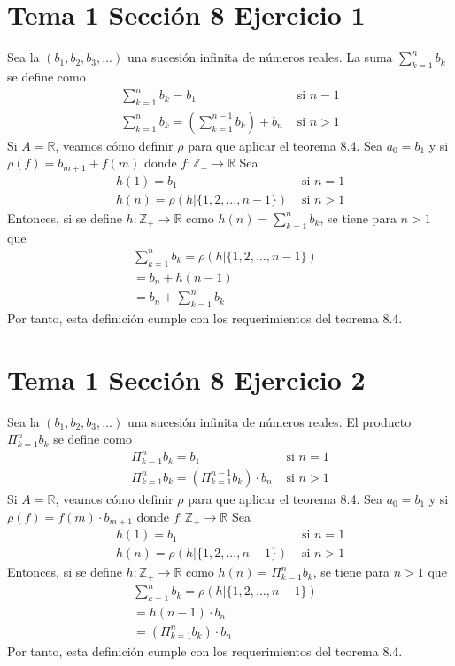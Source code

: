 \documentclass{article}
\begin{document}
\section{Tema 1 Sección 8 Ejercicio 1}
Sea la $(b_1,b_2,b_3,...)$ una sucesión infinita de números reales. La suma $\sum^n_{k=1}b_k$ se define como
\begin{eqnarray}
\sum^n_{k=1}b_k=b_1 & \text{ si }n=1 \nonumber\\
\sum^n_{k=1}b_k= (\sum^{n-1}_{k=1}b_k)+ b_n & \text{ si }n>1 \nonumber
\end{eqnarray}
Si $A=\mathbb{R}$, veamos cómo definir $\rho$ para que aplicar el teorema 8.4. Sea $a_0=b_1$ y si $\rho(f)=b_{m+1} +f(m)$ donde $f:\mathbb{Z}_{+} \rightarrow \mathbb{R}$ Sea 
\begin{eqnarray}
h(1)=b_1 & \text{ si }n=1 \nonumber\\
h(n)=\rho(h|\{1,2,...,n-1\}) & \text{ si }n>1 \nonumber
\end{eqnarray}
Entonces, si se define  $h:\mathbb{Z}_{+} \rightarrow \mathbb{R}$ como $h(n)=\sum^n_{k=1}b_k$, se tiene para $n>1$ que 
\begin{eqnarray}
\sum^n_{k=1}b_k=\rho(h|\{1,2,...,n-1\}) & \nonumber\\
=b_n+h(n-1) & \nonumber\\
=b_n+\sum^n_{k=1}b_k & \nonumber
\end{eqnarray}
Por tanto, esta definición cumple con los requerimientos del teorema 8.4.
\section{Tema 1 Sección 8 Ejercicio 2}
Sea la $(b_1,b_2,b_3,...)$ una sucesión infinita de números reales. El producto $\Pi^n_{k=1}b_k$ se define como
\begin{eqnarray}
\Pi^n_{k=1}b_k=b_1 & \text{ si }n=1 \nonumber\\
\Pi^n_{k=1}b_k= (\Pi^{n-1}_{k=1}b_k)\cdot b_n & \text{ si }n>1 \nonumber
\end{eqnarray}
Si $A=\mathbb{R}$, veamos cómo definir $\rho$ para que aplicar el teorema 8.4. Sea $a_0=b_1$ y si $\rho(f)=f(m)\cdot b_{m+1}$ donde $f:\mathbb{Z}_{+} \rightarrow \mathbb{R}$ Sea 
\begin{eqnarray}
h(1)=b_1 & \text{ si }n=1 \nonumber\\
h(n)=\rho(h|\{1,2,...,n-1\}) & \text{ si }n>1 \nonumber
\end{eqnarray}
Entonces, si se define  $h:\mathbb{Z}_{+} \rightarrow \mathbb{R}$ como $h(n)=\Pi^n_{k=1}b_k$, se tiene para $n>1$ que 
\begin{eqnarray}
\sum^n_{k=1}b_k=\rho(h|\{1,2,...,n-1\}) & \nonumber\\
=h(n-1)\cdot b_n & \nonumber\\
=(\Pi^n_{k=1}b_k)\cdot b_n & \nonumber
\end{eqnarray}
Por tanto, esta definición cumple con los requerimientos del teorema 8.4.
\end{document}
